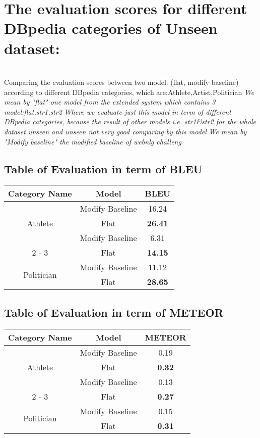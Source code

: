 \documentclass{article}%
\begin{document}
%
\normalsize%
\section{The evaluation scores for different DBpedia categories of Unseen dataset:}%
\textit{=============================================\newline%
}%
Comparing the evaluation scores between two model: (flat, modify baseline) according to different DBpedia categories, which are:Athlete,Artist,Politician \newline%
%
\textit{We mean by "flat" one model from the extended system which contains 3 model:flat,str1,str2\newline%
}%
\textit{Where we evaluate just this model in term of different DBpedia categories, because the result of other models i.e. str1\&str2 for the whole dataset unseen and unseen not very good comparing by this model\newline%
}%
\textit{We mean by "Modify baseline" the modified baseline of webnlg challeng \newline%
}%
\subsection{Table of Evaluation in term of BLEU \newline%
}%
\begin{tabular}{|c|c|c|}%
\hline%
\textbf{Category Name}&\textbf{Model}&\textbf{BLEU}\\%
\hline%
\multirow{3}{*}{Athlete}&Modify Baseline&16.24\\%
\cline{2%
-%
3}%
&Flat&\textbf{26.41}\\%
\hline%
\hline%
\multirow{3}{*}{Artist}&Modify Baseline&6.31\\%
\cline{2%
-%
3}%
&Flat&\textbf{14.15}\\%
\hline%
\hline%
\multirow{3}{*}{Politician}&Modify Baseline&11.12\\%
\cline{2%
-%
3}%
&Flat&\textbf{28.65}\\%
\hline%
\hline%
\end{tabular}

%
\subsection{Table of Evaluation in term of METEOR \newline%
}%
\begin{tabular}{|c|c|c|}%
\hline%
\textbf{Category Name}&\textbf{Model}&\textbf{METEOR}\\%
\hline%
\multirow{3}{*}{Athlete}&Modify Baseline&0.19\\%
\cline{2%
-%
3}%
&Flat&\textbf{0.32}\\%
\hline%
\hline%
\multirow{3}{*}{Artist}&Modify Baseline&0.13\\%
\cline{2%
-%
3}%
&Flat&\textbf{0.27}\\%
\hline%
\hline%
\multirow{3}{*}{Politician}&Modify Baseline&0.15\\%
\cline{2%
-%
3}%
&Flat&\textbf{0.31}\\%
\hline%
\hline%
\end{tabular}
\end{document}
